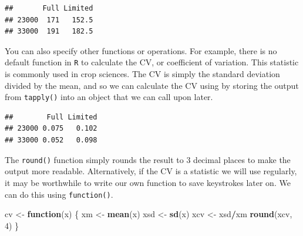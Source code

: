 \documentclass[letterpaper,]{book}
\newenvironment{Shaded}{\begin{snugshade}}{\end{snugshade}}
\newcommand{\ControlFlowTok}[1]{\textcolor[rgb]{0.13,0.29,0.53}{\textbf{#1}}}
\newcommand{\DecValTok}[1]{\textcolor[rgb]{0.00,0.00,0.81}{#1}}
\newcommand{\KeywordTok}[1]{\textcolor[rgb]{0.13,0.29,0.53}{\textbf{#1}}}
\newcommand{\NormalTok}[1]{#1}
\newcommand{\OperatorTok}[1]{\textcolor[rgb]{0.81,0.36,0.00}{\textbf{#1}}}
\newcommand{\StringTok}[1]{\textcolor[rgb]{0.31,0.60,0.02}{#1}}
\begin{document}
\begin{verbatim}
##       Full Limited
## 23000  171   152.5
## 33000  191   182.5
\end{verbatim}

You can also specify other functions or operations. For example, there is no default function in \texttt{R} to calculate the CV, or coefficient of variation. This statistic is commonly used in crop sciences. The CV is simply the standard deviation divided by the mean, and so we can calculate the CV using by storing the output from \texttt{tapply()} into an object that we can call upon later.

\begin{Shaded}
\end{Shaded}

\begin{verbatim}
##        Full Limited
## 23000 0.075   0.102
## 33000 0.052   0.098
\end{verbatim}

The \texttt{round()} function simply rounds the result to 3 decimal places to make the output more readable. Alternatively, if the CV is a statistic we will use regularly, it may be worthwhile to write our own function to save keystrokes later on. We can do this using \texttt{function()}.

\begin{Shaded}
\begin{Highlighting}[]
\NormalTok{cv <-}\StringTok{ }\ControlFlowTok{function}\NormalTok{(x) \{}
\NormalTok{  xm  <-}\StringTok{ }\KeywordTok{mean}\NormalTok{(x)}
\NormalTok{  xsd <-}\StringTok{ }\KeywordTok{sd}\NormalTok{(x)}
\NormalTok{  xcv <-}\StringTok{ }\NormalTok{xsd}\OperatorTok{/}\NormalTok{xm}
  \KeywordTok{round}\NormalTok{(xcv, }\DecValTok{4}\NormalTok{)}
\NormalTok{\}}
\end{Highlighting}
\end{Shaded}
\end{document}
